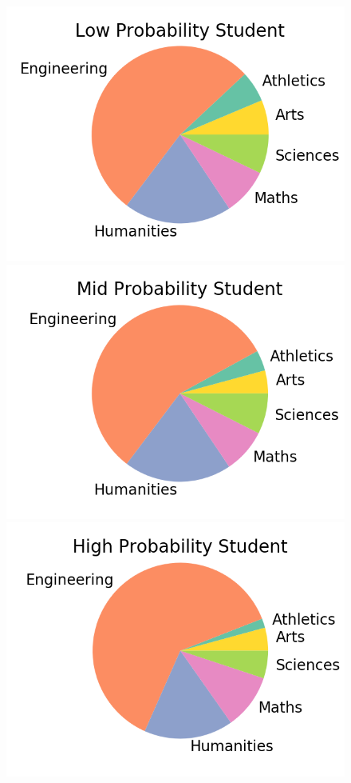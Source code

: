 \documentclass{edm_template}
\begin{document}
\begin{figure}[h]
    \centering
    \includegraphics[scale=0.25]{figures/lowpie.png}
    \includegraphics[scale=0.25]{figures/midpie.png} \\
    \includegraphics[scale=0.25]{figures/highpie.png}

\end{figure}
\end{document}
